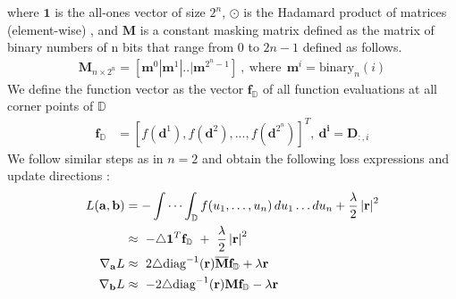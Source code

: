 where $\mathbf{1}$ is the all-ones vector of size $2^{n}$, $\odot$ is the Hadamard product of matrices (element-wise) , and $\mathbf{M}$ is a constant  masking matrix defined as the matrix of binary numbers of n bits that range from 0 to $2{n} - 1 $ defined as follows.
\begin{equation}
\begin{aligned} 
\mathbf{M}_{n\times 2^{n}} = \left[\mathbf{m}^{0} | \mathbf{m}^{1} |.. | \mathbf{m}^{2^{n}-1}\right] ~, ~ \text{where}~~ \mathbf{m}^{i} = \text{binary}_{n}(i)
\label{eq:n-mask-sup}
\end{aligned}
\end{equation}
We define the function vector as the vector $\mathbf{f}_{\mathbb{D}}$ of all function evaluations at all corner points of $\mathbb{D}$
\begin{equation}
\begin{aligned} 
\mathbf{f}_{\mathbb{D}} &= \left[f(\mathbf{d}^{1}), f(\mathbf{d}^{2}),...,f(\mathbf{d}^{2^{n}}) \right]^{T} , ~ \mathbf{d^{i}} = \mathbf{D}_{:,i}
\label{eq:n-function-sup}
\end{aligned}
\end{equation}
We follow similar steps as in $n=2$ and obtain the following loss expressions and update directions :
\begin{equation}
\begin{aligned} 
L(\mathbf{a},\mathbf{b}) &= - \idotsint_\mathbb{D} f(u_1,\dots,u_n) \,du_1 \dots du_n  + \frac{\lambda}{2} \left| \mathbf{r}\right|^{2}\\ 
&\approx~ -\triangle\mathbf{1}^{T}\mathbf{f}_{\mathbb{D}} ~+~ \frac{\lambda}{2} \left| \mathbf{r}\right|^{2}\\ 
\nabla_{\mathbf{a}}L  &\approx~ 2\triangle\text{diag}^{-1}(\mathbf{r}) \overline{\mathbf{M}}\mathbf{f}_{\mathbb{D}} + \lambda \mathbf{r}\\
\nabla_{\mathbf{b}}L  &\approx~ -2\triangle\text{diag}^{-1}(\mathbf{r}) \mathbf{M}\mathbf{f}_{\mathbb{D}} - \lambda \mathbf{r}
\label{eq:n-loss-update-naive-sup}
\end{aligned}
\end{equation}

